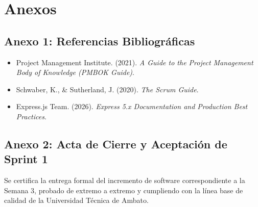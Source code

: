 \documentclass[12pt,a4paper]{article}
\begin{document}
\vspace{0.4cm}

\section{Anexos}

\subsection*{Anexo 1: Referencias Bibliográficas}
\begin{itemize}[leftmargin=1.5em, itemsep=2pt]
    \item Project Management Institute. (2021). \textit{A Guide to the Project Management Body of Knowledge (PMBOK Guide)}.
    \item Schwaber, K., \& Sutherland, J. (2020). \textit{The Scrum Guide}.
    \item Express.js Team. (2026). \textit{Express 5.x Documentation and Production Best Practices}.
\end{itemize}

\subsection*{Anexo 2: Acta de Cierre y Aceptación de Sprint 1}
Se certifica la entrega formal del incremento de software correspondiente a la Semana 3, probado de extremo a extremo y cumpliendo con la línea base de calidad de la Universidad Técnica de Ambato.
\end{document}
